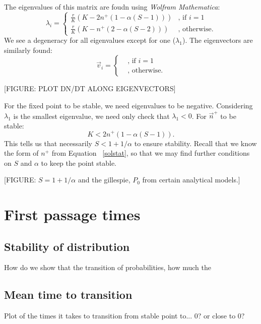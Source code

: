 \documentclass[11pt,a4paper,final]{iopart}
\begin{document}
The eigenvalues of this matrix are foudn using \textit{Wolfram Mathematica}:
\begin{equation}
\lambda_i =
\begin{cases}
\frac{r}{K}\left( K - 2 n^+(1-\alpha(S-1)) \right) & \text{, if } i=1 \\
\frac{r}{K}\left( K - n^+(2-\alpha(S-2)) \right) & \text{, otherwise}.
\end{cases}
\end{equation}
We see a degeneracy for all eigenvalues except for one ($\lambda_1$). 
The eigenvectors are similarly found:
\begin{equation}
\vec{v}_i =
\begin{cases}
 & \text{, if } i=1 \\
 & \text{, otherwise}.
\end{cases}
\end{equation}

[FIGURE: PLOT DN/DT ALONG EIGENVECTORS]

For the fixed point to be stable, we need eigenvalues to be negative. 
Considering $\lambda_1$ is the smallest eigenvalue, we need only check that  $\lambda_1 < 0 $. For $\vec{n}^+$ to be stable:
\begin{equation}
K < 2n^+(1-\alpha (S-1) ).
\end{equation}
This tells us that necessarily $S<1+1/\alpha$ to ensure stability.
Recall that we know the form of $n^+$ from Equation ~\ref{solstat}, so that we may find further conditions on $S$ and $\alpha$ to keep the point stable.

[FIGURE: $S=1+1/\alpha$ and the gillespie, $P_0$ from certain analytical models.]

\section{First passage times}


\subsection{Stability of distribution}

How do we show that the transition of probabilities, how much the 

\subsection{Mean time to transition}

Plot of the times it takes to transition from stable point to... 0? or close to 0?
\end{document}
